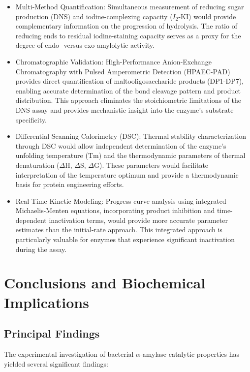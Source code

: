 \documentclass[
  12pt,
]{article}
\begin{document}
\begin{itemize}
\item
  Multi-Method Quantification: Simultaneous measurement of reducing
  sugar production (DNS) and iodine-complexing capacity (\(I_{2}\)-KI)
  would provide complementary information on the progression of
  hydrolysis. The ratio of reducing ends to residual iodine-staining
  capacity serves as a proxy for the degree of endo- versus
  exo-amylolytic activity.
\item
  Chromatographic Validation: High-Performance Anion-Exchange
  Chromatography with Pulsed Amperometric Detection (HPAEC-PAD) provides
  direct quantification of maltooligosaccharide products (DP1-DP7),
  enabling accurate determination of the bond cleavage pattern and
  product distribution. This approach eliminates the stoichiometric
  limitations of the DNS assay and provides mechanistic insight into the
  enzyme's substrate specificity.
\item
  Differential Scanning Calorimetry (DSC): Thermal stability
  characterization through DSC would allow independent determination of
  the enzyme's unfolding temperature (Tm) and the thermodynamic
  parameters of thermal denaturation (\(\Delta\)H, \(\Delta\)S,
  \(\Delta\)G). These parameters would facilitate interpretation of the
  temperature optimum and provide a thermodynamic basis for protein
  engineering efforts.
\item
  Real-Time Kinetic Modeling: Progress curve analysis using integrated
  Michaelis-Menten equations, incorporating product inhibition and
  time-dependent inactivation terms, would provide more accurate
  parameter estimates than the initial-rate approach. This integrated
  approach is particularly valuable for enzymes that experience
  significant inactivation during the assay.
\end{itemize}

\section{Conclusions and Biochemical
Implications}\label{conclusions-and-biochemical-implications}

\subsection{Principal Findings}\label{principal-findings}

The experimental investigation of bacterial \(\alpha\)-amylase catalytic
properties has yielded several significant findings:
\end{document}
